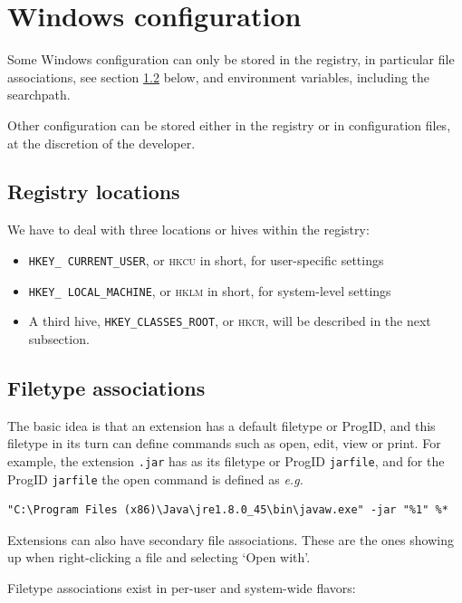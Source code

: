 \documentclass[11pt,a4paper,oneside]{report}
\def\dbr{\discretionary{}{}{}}
\def\hkcu{\textsc{hkcu}}
\def\hklm{\textsc{hklm}}
\def\hkcr{\textsc{hkcr}}
\begin{document}
\section{Windows configuration}
\label{sec:wconfig}

Some Windows configuration can only be stored in the registry, in
particular file associations, see section \ref{sec:wftas} below, and
environment variables, including the searchpath.

Other configuration can be stored either in the registry or in
configuration files, at the discretion of the developer.

\subsection{Registry locations}
\label{sec:hives}

We have to deal with three locations or hives within the registry:
\begin{itemize}
\item \texttt{HKEY\_\dbr
    CURRENT\_\dbr USER}, or \hkcu{} in short, for user-specific settings
\item \texttt{HKEY\_\dbr
    LOCAL\_\dbr MACHINE}, or \hklm{} in short, for system-level settings
\item A third hive, \texttt{HKEY\_\dbr CLASSES\_\dbr ROOT}, or
  \hkcr, will be described in the next subsection.
\end{itemize}

\subsection{Filetype associations}
\label{sec:wftas}

The basic idea is that an extension has a default filetype or
ProgID, and this filetype in its turn can define commands such as
open, edit, view or print.  For example, the extension \texttt{.jar}
has as its filetype or ProgID \texttt{jarfile}, and for the ProgID
\texttt{jarfile} the open command is defined as \emph{e.g.}\par
{\footnotesize
\begin{verbatim}
"C:\Program Files (x86)\Java\jre1.8.0_45\bin\javaw.exe" -jar "%1" %*
\end{verbatim}
}\normalsize
Extensions can also have secondary file associations. These are
the ones showing up when right-clicking a file and selecting `Open
with\textellipsis'.

Filetype associations exist in per-user and system-wide flavors:
\end{document}
